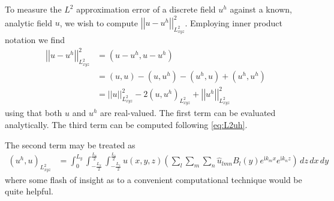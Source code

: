 \documentclass[letterpaper,11pt,nointlimits,reqno]{amsart}
\newcommand{\ii}{\ensuremath{\mathrm{i}}}
\begin{document}
To measure the $L^2$ approximation error of a discrete field $u^h$ against a
known, analytic field $u$, we wish to compute $\left|\left| u - u^h
\right|\right|^{2}_{L^{2}_{xyz}}$.  Employing inner product notation we find
\begin{align}
  \left|\left| u - u^h \right|\right|^{2}_{L^{2}_{xyz}}
&=
  \left( u-u^h, u-u^h \right)
\\ &=
    \left( u, u \right)
  - \left( u, u^h \right)
  - \left( u^h, u \right)
  + \left(u^h, u^h\right)
\\ &=
    \left|\left| u   \right|\right|^{2}_{L^{2}_{xyz}}
  - 2 \left( u, u^h \right)_{L^{2}_{xyz}}
  + \left|\left| u^h \right|\right|^{2}_{L^{2}_{xyz}}
\end{align}
using that both $u$ and $u^h$ are real-valued.  The first term can be evaluated
analytically.  The third term can be computed following \eqref{eq:L2uh}.

The second term may be treated as
\begin{align}
  \left( u^h, u \right)_{L^{2}_{xyz}}
&=
  \int_0^{L_y}
  \int_{-\frac{L_x}{2}}^{\frac{L_x}{2}}
  \int_{-\frac{L_z}{2}}^{\frac{L_z}{2}}
  u\!\left(x,y,z\right)
  \left(
    \sum_{l}\sum_{m}\sum_{n}
    \hat{u}_{l m n}B_l\!\left(y\right)e^{\ii k_m x}e^{\ii k_n z}
  \right)
  \,d\!z \,d\!x \,d\!y
\end{align}
where some flash of insight as to a convenient computational technique would be
quite helpful.
\end{document}
